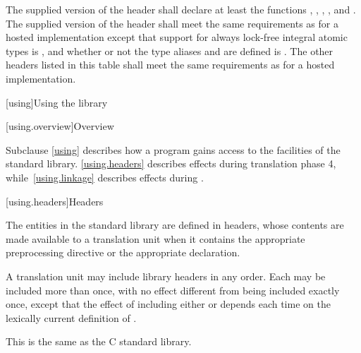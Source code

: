 \pnum
The supplied version of the header 
shall declare at least the functions
%
,
%
,
%
,
%
,
and
%
.
%
The supplied version of the header 
shall meet the same requirements as for a hosted implementation
except that support for
always lock-free integral atomic types
is , and
whether or not the type aliases  and
 are defined
is .
The other headers listed in this table
shall meet the same requirements as for a hosted implementation.
%

[using]{Using the library}

[using.overview]{Overview}

\pnum
Subclause \ref{using} describes how a \Cpp{} program gains access to the facilities of the
\Cpp{} standard library. \ref{using.headers} describes effects during translation
phase 4, while~\ref{using.linkage} describes effects during .

[using.headers]{Headers}

\pnum
The entities in the \Cpp{} standard library are defined in headers,
whose contents are made available to a translation unit when it contains the appropriate
%
%
preprocessing directive
or the appropriate
%
 declaration.

\pnum
A translation unit may include library headers in any order.
%
Each may be included more than once, with no effect different from
being included exactly once, except that the effect of including either
 or 
depends each time on the lexically current definition of
%
%
.
\begin{footnote}
This is the same as the C standard library.
\end{footnote}


